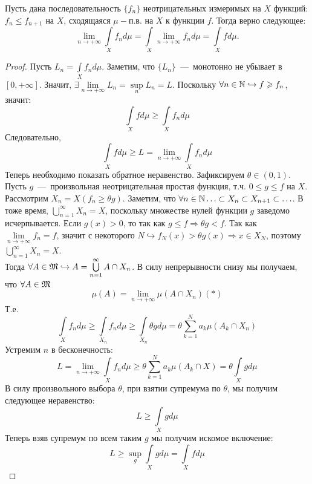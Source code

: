 \hypertarget{beppo_levi}{}
\begin{theorem}
    Пусть дана последовательность $\{f_n\}$ неотрицательных измеримых на $X$ функций: $f_n \leq f_{n + 1}$ на $X$, сходящаяся $\mu-$п.в. на $X$ к функции $f$. Тогда верно следующее: \[\lim\limits_{n \rightarrow +\infty} \int\limits_X f_nd\mu = \int\limits_X \lim\limits_{n \rightarrow +\infty} f_n d\mu = \int\limits_X fd\mu.\]
\end{theorem}
\begin{proof}
    Пусть $L_n = \int\limits_X f_nd\mu$. Заметим, что $\{L_n\}$~---~монотонно не убывает в $[0, +\infty]$. Значит, $\exists \lim\limits_{n\rightarrow+\infty} L_n = \sup\limits_n L_n = L$. Поскольку $\forall n \in \mathbb{N} \hookrightarrow f \geqslant f_n$, значит: \[\int\limits_X fd\mu \geq \int\limits_X f_nd\mu\]
    Следовательно, \[\int\limits_X fd\mu \geq L = \lim\limits_{n \rightarrow +\infty} \int\limits_X f_nd\mu\]
    Теперь необходимо показать обратное неравенство. Зафиксируем $\theta \in (0, 1)$. Пусть $g$~---~произвольная неотрицательная простая функция, т.ч. $0 \leq g \leq f$ на $X$.\\ Рассмотрим $X_n = X(f_n \geq \theta g)$. Заметим, что $ \forall n \in \mathbb{N} \ldots \subset X_n \subset X_{n + 1} \subset \ldots$. В тоже время, $\bigcup\limits_{n = 1}^\infty X_n = X$, поскольку множестве нулей функции $g$ заведомо исчерпывается. Если $g(x) > 0$, то так как $g \leq f \Rightarrow \theta g < f$. Так как $\lim\limits_{n\rightarrow +\infty}f_n = f$, значит с некоторого $N \hookrightarrow f_N(x) > \theta g(x) \Rightarrow x \in X_N$, поэтому $\bigcup\limits_{n = 1}^\infty X_n = X$. \\
    Тогда $\forall A \in \mathfrak{M} \hookrightarrow A = \bigcup\limits_{n = 1}^\infty A \cap X_n$. В силу непрерывности снизу мы получаем, что $\forall A \in \mathfrak{M}$ \[\mu(A) = \lim\limits_{n \rightarrow +\infty} \mu(A \cap X_n) (*)\]
    Т.е. \[\int\limits_X f_nd\mu \geq \int\limits_{X_n} f_nd\mu \geq \int\limits_{X_n} \theta g d\mu = \theta \sum\limits_{k = 1}^N a_k\mu(A_k \cap X_n)\]
    Устремим $n$ в бесконечность:
    \[L = \lim\limits_{n \rightarrow +\infty} \int\limits_X f_nd\mu \geq \theta\sum\limits_{k = 1}^N a_k\mu(A_k \cap X) = \theta\int\limits_{X} gd\mu \]
    В силу произвольного выбора $\theta$, при взятии супремума по $\theta$, мы получим следующее неравенство: \[L \geq \int\limits_X gd\mu\]
    Теперь взяв супремум по всем таким $g$ мы получим искомое включение: \[L \geq \sup\limits_g \int\limits_X gd\mu = \int\limits_X fd\mu\]
\end{proof} 


